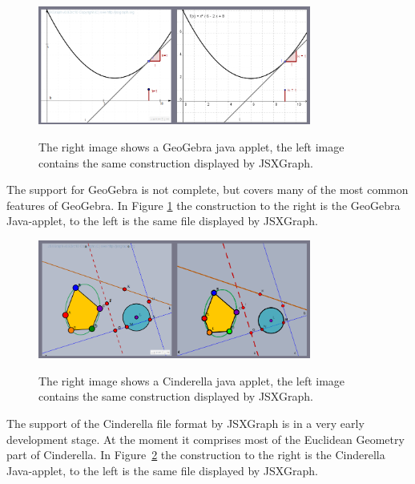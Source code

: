 \documentclass[12pt,a4paper]{article}%
\begin{document}
\begin{figure}[ht]
\begin{center}
\includegraphics[width=0.8\textwidth]{geogebra.png}\\
\caption{The right image shows a GeoGebra java applet, 
the left image contains the same construction displayed 
by JSXGraph.}\label{fig:geogebra}
\end{center}
\end{figure}
The support for GeoGebra is not complete, but covers many of the most common features of  GeoGebra. In Figure \ref{fig:geogebra} the construction to the right is the GeoGebra Java-applet, to the left is the same file displayed by JSXGraph.


\begin{figure}[ht]
\begin{center}
\includegraphics[width=0.8\textwidth]{cindy.png}\\
\caption{The right image shows a Cinderella java applet, 
the left image contains the same construction displayed 
by JSXGraph.}\label{fig:cindy}
\end{center}
\end{figure}
The support of the Cinderella file format \cite{kortenkamp1999} by JSXGraph is in a very early development stage. At the moment it comprises most of the Euclidean Geometry part of Cinderella. In Figure~\ref{fig:cindy} the construction to the right is the Cinderella Java-applet, to the left is the same file displayed by JSXGraph.
\end{document}
